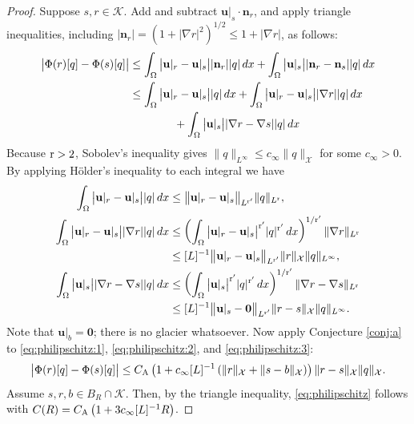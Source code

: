 \documentclass[hidelinks,onefignum,onetabnum,final]{siamart220329}  %
\newcommand{\grad}{\nabla}
\newcommand{\bn}{\mathbf{n}}
\newcommand{\bu}{\mathbf{u}}
\newcommand{\bzero}{\bm{0}}
\newcommand{\cK}{\mathcal{K}}
\newcommand{\cX}{\mathcal{X}}
\newcommand{\rr}{{\text{\textnormal{r}}}}
\newcommand{\CA}{C_\text{\textnormal{A}}}
\begin{document}
\begin{proof}  Suppose $s,r\in\cK$.  Add and subtract $\bu|_s \cdot \bn_r$, and apply triangle inequalities, including $|\bn_r|=\left(1+|\grad r|^2\right)^{1/2} \le 1 + |\grad r|$, as follows:
\begin{align}
\big|\Phi(r)[q] - \Phi(s)[q]\big| &\le \int_\Omega \big|\bu|_r - \bu|_s\big| |\bn_r| |q|\,dx + \int_\Omega \big|\bu|_s\big| |\bn_r-\bn_s| |q|\,dx \\
    &\le \int_\Omega \big|\bu|_r - \bu|_s\big| |q|\,dx + \int_\Omega \big|\bu|_r - \bu|_s\big| |\grad r| |q|\,dx \notag \\
    &\qquad\qquad + \int_\Omega \big|\bu|_s\big| |\grad r-\grad s| |q|\,dx \notag
\end{align}
Because $\rr>2$, Sobolev's inequality gives $\|q\|_{L^\infty} \le c_\infty \|q\|_\cX$ for some $c_\infty>0$.  By applying H\"older's inequality to each integral we have
\begin{align}
\int_\Omega \big|\bu|_r - \bu|_s\big| |q|\,dx &\le \big\|\bu|_r - \bu|_s\big\|_{L^{\rr'}} \|q\|_{L^{\rr}}, \label{eq:philipschitz:1} \\
\int_\Omega \big|\bu|_r - \bu|_s\big| |\grad r| |q|\,dx &\le \left(\int_\Omega \big|\bu|_r - \bu|_s\big|^{\rr'} |q|^{\rr'}\, dx\right)^{1/\rr'} \|\grad r\|_{L^\rr} \label{eq:philipschitz:2} \\
    &\le [L]^{-1} \big\|\bu|_r - \bu|_s\big\|_{L^{\rr'}} \|r\|_{\cX} \|q\|_{L^\infty}, \notag \\
\int_\Omega \big|\bu|_s\big| |\grad r-\grad s| |q|\,dx &\le \left(\int_\Omega \big|\bu|_s\big|^{\rr'} |q|^{\rr'}\, dx\right)^{1/\rr'} \|\grad r- \grad s\|_{L^\rr}  \label{eq:philipschitz:3} \\
    &\le [L]^{-1} \big\|\bu|_s - \bzero\big\|_{L^{\rr'}} \|r-s\|_{\cX} \|q\|_{L^\infty}. \notag
\end{align}
Note that $\bu|_b=\bzero$; there is no glacier whatsoever.  Now apply Conjecture \ref{conj:a} to \eqref{eq:philipschitz:1}, \eqref{eq:philipschitz:2}, and \eqref{eq:philipschitz:3}:
\begin{equation}
\big|\Phi(r)[q] - \Phi(s)[q]\big| \le \CA \left(1 + c_\infty [L]^{-1} \left(\|r\|_{\cX} + \|s - b\|_{\cX}\right)\right) \|r-s\|_{\cX} \|q\|_{\cX}.
\end{equation}
Assume $s,r,b\in B_R\cap \cK$.  Then, by the triangle inequality, \eqref{eq:philipschitz} follows with $C(R) = \CA \left(1 + 3 c_\infty [L]^{-1} R\right)$.
\end{proof}
\end{document}
